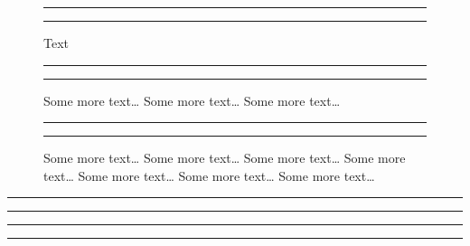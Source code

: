 \documentclass{amsart}
\begin{document}
\begin{figure}
\hrule
\caption{Text}
\hrule
\end{figure}
\begin{figure}
\hrule
\caption{Some more text\ldots{} Some more text\ldots{} Some more text\ldots{}}
\hrule
\end{figure}
\begin{figure}
\hrule
\caption{Some more text\ldots{} Some more text\ldots{} Some more text\ldots{} Some more text\ldots{} Some more text\ldots{} Some more text\ldots{} Some more text\ldots{}}
\hrule
\end{figure}
\begin{table}
\hrule
\caption{Text}
\hrule
\end{table}
\begin{table}
\hrule
\caption{Some more text\ldots{} Some more text\ldots{} Some more text\ldots{} Some more text\ldots{} Some more text\ldots{} Some more text\ldots{} Some more text\ldots{}}
\hrule
\end{table}
\end{document}
